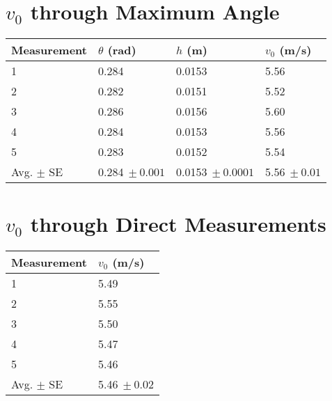 

\rmfamily

\section{$v_0$ through Maximum Angle}
\begin{table}[!htb]
	\centering
	\begin{tabular}{@{}llrl@{}}
		\toprule
		\multicolumn{1}{c}{Measurement} & $\theta$ (rad) & \multicolumn{1}{l}{$h$ (m)} & $v_0$ (m/s) \\ \midrule
		\multicolumn{1}{l|}{1} & \multicolumn{1}{l|}{0.284} & \multicolumn{1}{l|}{0.0153} & 5.56 \\
		\multicolumn{1}{l|}{2} & \multicolumn{1}{l|}{0.282} & \multicolumn{1}{l|}{0.0151} & 5.52 \\
		\multicolumn{1}{l|}{3} & \multicolumn{1}{l|}{0.286} & \multicolumn{1}{l|}{0.0156} & 5.60 \\
		\multicolumn{1}{l|}{4} & \multicolumn{1}{l|}{0.284} & \multicolumn{1}{l|}{0.0153} & 5.56 \\
		\multicolumn{1}{l|}{5} & \multicolumn{1}{l|}{0.283} & \multicolumn{1}{l|}{0.0152} & 5.54 \\ \midrule
		\multicolumn{1}{l|}{Avg. $\pm$ SE} & \multicolumn{1}{l|}{0.284$\ \pm 0.001$} & \multicolumn{1}{l|}{0.0153$\ \pm 0.0001$} & 5.56$\ \pm 0.01$ \\ \bottomrule
	\end{tabular}
\end{table}

\section{$v_0$ through Direct Measurements}
\begin{table}[!htb]
	\centering
	\begin{tabular}{@{}ll@{}}
		\toprule
		\multicolumn{1}{c}{Measurement} & $v_0$ (m/s) \\ \midrule
		\multicolumn{1}{l|}{1} & 5.49\\
		\multicolumn{1}{l|}{2} & 5.55 \\
		\multicolumn{1}{l|}{3} & 5.50 \\
		\multicolumn{1}{l|}{4} & 5.47 \\
		\multicolumn{1}{l|}{5} & 5.46 \\ \midrule
		\multicolumn{1}{l|}{Avg. $\pm$ SE} & 5.46$\ \pm 0.02$ \\ \bottomrule
	\end{tabular}
\end{table}

